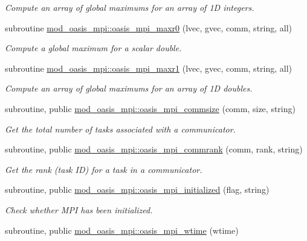 \begin{DoxyCompactItemize}
\begin{DoxyCompactList}\small\item\em Compute an array of global maximums for an array of 1D integers. \end{DoxyCompactList}\item 
subroutine \hyperlink{namespacemod__oasis__mpi_a7f46e23956ff948e039c5c1cdde0f6f3}{mod\+\_\+oasis\+\_\+mpi\+::oasis\+\_\+mpi\+\_\+maxr0} (lvec, gvec, comm, string, all)
\begin{DoxyCompactList}\small\item\em Compute a global maximum for a scalar double. \end{DoxyCompactList}\item 
subroutine \hyperlink{namespacemod__oasis__mpi_ae57151fc4714e33d7e0e1cf0aa65ae64}{mod\+\_\+oasis\+\_\+mpi\+::oasis\+\_\+mpi\+\_\+maxr1} (lvec, gvec, comm, string, all)
\begin{DoxyCompactList}\small\item\em Compute an array of global maximums for an array of 1D doubles. \end{DoxyCompactList}\item 
subroutine, public \hyperlink{namespacemod__oasis__mpi_adac784196d7af85611752214137dd4db}{mod\+\_\+oasis\+\_\+mpi\+::oasis\+\_\+mpi\+\_\+commsize} (comm, size, string)
\begin{DoxyCompactList}\small\item\em Get the total number of tasks associated with a communicator. \end{DoxyCompactList}\item 
subroutine, public \hyperlink{namespacemod__oasis__mpi_a2690a841a331f4398cc4b5a244bbc52e}{mod\+\_\+oasis\+\_\+mpi\+::oasis\+\_\+mpi\+\_\+commrank} (comm, rank, string)
\begin{DoxyCompactList}\small\item\em Get the rank (task ID) for a task in a communicator. \end{DoxyCompactList}\item 
subroutine, public \hyperlink{namespacemod__oasis__mpi_a384f170e63ac03f25d3bd549245b43f3}{mod\+\_\+oasis\+\_\+mpi\+::oasis\+\_\+mpi\+\_\+initialized} (flag, string)
\begin{DoxyCompactList}\small\item\em Check whether M\+PI has been initialized. \end{DoxyCompactList}\item 
subroutine, public \hyperlink{namespacemod__oasis__mpi_aa3786c2cab131c3834583e7943ba28c8}{mod\+\_\+oasis\+\_\+mpi\+::oasis\+\_\+mpi\+\_\+wtime} (wtime)

\end{DoxyCompactItemize}
